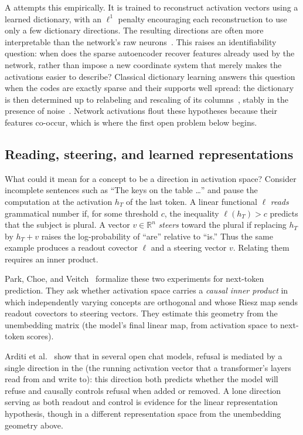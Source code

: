 A  attempts this empirically.
It is trained to reconstruct activation vectors using a learned dictionary,
with an $\ell^1$ penalty encouraging each reconstruction to use only a few
dictionary directions.
The resulting directions are often more interpretable than the network's raw
neurons~\cite{bricken2023,cunningham2023}.
This raises an identifiability question: when does the sparse autoencoder
recover features already used by the network, rather than impose a new
coordinate system that merely makes the activations easier to describe?
Classical dictionary learning answers this question when the codes are
exactly sparse and their supports well spread: the dictionary is then
determined up to relabeling and rescaling of its
columns~\cite{aharon2006,hillar2015}, stably in the presence of
noise~\cite{gribonval2015,garfinkle2019}.
Network activations flout these hypotheses because their features co-occur,
which is where the first open problem below begins.

\subsection{Reading, steering, and learned representations}

What could it mean for a concept to be a direction in activation space?
Consider incomplete sentences such as ``The keys on the table \ldots'' and
pause the computation at the activation $h_T$ of the last token.
A linear functional $\ell$ \emph{reads} grammatical number if, for some
threshold $c$, the inequality $\ell(h_T)>c$ predicts that the subject is
plural.
A vector $v\in\mathbb{R}^n$ \emph{steers} toward the plural if replacing
$h_T$ by $h_T+v$ raises the log-probability of ``are'' relative to ``is.''
Thus the same example produces a readout covector $\ell$ and a steering
vector $v$.
Relating them requires an inner product.

Park, Choe, and Veitch~\cite{park2023} formalize these two experiments for
next-token prediction.
They ask whether activation space carries a \emph{causal inner product}
in which independently varying concepts are orthogonal and whose Riesz map
sends readout covectors to steering vectors.
They estimate this geometry from the unembedding matrix
(the model's final linear map, from activation space to next-token
scores).

Arditi et al.~\cite{arditi2024} show that in several open chat models, refusal is mediated by a single direction in the  (the running activation vector that a transformer's layers read from and write to): this direction both predicts whether the model will refuse and causally controls refusal when added or removed. A lone direction serving as both readout and control is evidence for the linear representation hypothesis, though in a different representation space from the unembedding geometry above.

